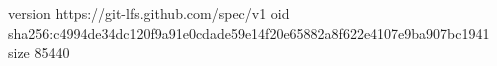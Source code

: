 version https://git-lfs.github.com/spec/v1
oid sha256:c4994de34dc120f9a91e0cdade59e14f20e65882a8f622e4107e9ba907bc1941
size 85440
